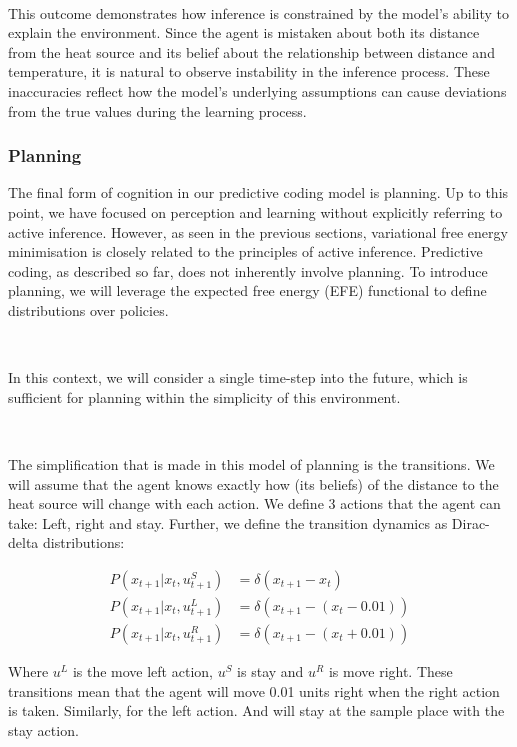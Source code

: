 \documentclass{article}
\begin{document}
\

This outcome demonstrates how inference is constrained by the model's ability to explain the environment. Since the agent is mistaken about both its distance from the heat source and its belief about the relationship between distance and temperature, it is natural to observe instability in the inference process. These inaccuracies reflect how the model's underlying assumptions can cause deviations from the true values during the learning process.

\subsubsection{Planning}

The final form of cognition in our predictive coding model is planning. Up to this point, we have focused on perception and learning without explicitly referring to active inference. However, as seen in the previous sections, variational free energy minimisation is closely related to the principles of active inference. Predictive coding, as described so far, does not inherently involve planning. To introduce planning, we will leverage the expected free energy (EFE) functional to define distributions over policies.

\

In this context, we will consider a single time-step into the future, which is sufficient for planning within the simplicity of this environment.

\

The simplification that is made in this model of planning is the transitions. We will assume that the agent knows exactly how (its beliefs) of the distance to the heat source will change with each action. We define 3 actions that the agent can take: Left, right and stay. Further, we define the transition dynamics as Dirac-delta distributions:

\begin{equation}
\begin{aligned}
	P(x_{t+1} | x_t, u^S_{t+1}) &= \delta(x_{t+1} - x_t ) \\
	P(x_{t+1} | x_t, u^L_{t+1}) &= \delta(x_{t+1} - ( x_t - 0.01) ) \\
	P(x_{t+1} | x_t, u^R_{t+1}) &= \delta(x_{t+1} - ( x_t + 0.01) ) 
\end{aligned}
\end{equation}

Where $u^L$ is the move left action, $u^S$ is stay and $u^R$ is move right. These transitions mean that the agent will move 0.01 units right when the right action is taken. Similarly, for the left action. And will stay at the sample place with the stay action. 
\end{document}
